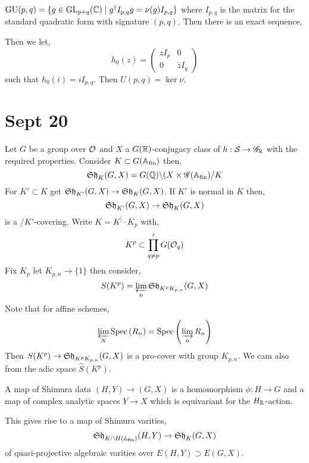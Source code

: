 \documentclass[12pt]{article}
\newcommand{\bs}{\backslash}
\begin{document}
\newcommand{\GU}{\mathrm{GU}}
\newcommand{\fin}{\mathrm{fin}}
\newcommand{\st}{\mathrm{st}}

\begin{defn}
$\GU(p,q) = \{ g \in \GL_{p+q}(\CC) \mid g^\dagger I_{p,q} g = \nu(g) I_{p,q} \}$ where $I_{p,q}$ is the matrix for the standard quadratic form with signature $(p,q)$. Then there is an exact sequence,
\begin{center}
\end{center} 
Then we let,
\[ h_0(z) = 
\begin{pmatrix}
z I_p & 0
\\
0 & \bar{z} I_q
\end{pmatrix} \]
such that $h_0(i) = i I_{p,q}$. Then $U(p,q) = \ker{\nu}$. 
\end{defn}

\section{Sept 20}


Let $G$ be a group over $\mathcal{O}_{}$ and $X$ a $G(\mathbb{R})$-conjugacy class of $h : \mathcal{S} \to \mathscr{G}_{\mathbb{R}}$ with the required properties. Consider $K \subset G(\A_{\fin})$ then,
\[ \Sh_K(G,X) = G(\Q) \bs (X \times \G(\A_{\fin}) / K \]
For $K' \subset K$ get $\mathfrak{Sh}_{K'}(G, X) \to \mathfrak{Sh}_K(G, X)$. If $K'$ is normal in $K$ then,
\[ \mathfrak{Sh}_{K'}(G, X) \to \mathfrak{Sh}_{K}(G, X) \]
is a $/K'$-covering. Write $K = K^[ \cdot K_p$ with,
\[ K^p \subset \prod_{q \neq p}' G(\mathcal{O}_{q}) \]
Fix $K_p$ let $K_{p,n} \to \{ 1 \}$ then consider,
\[ S(K^p) = \varprojlim_n \mathfrak{Sh}_{K^{p} K_{p,n}}(G, X) \]
Note that for affine schemes,
\[ \varprojlim_N \mathrm{Spec}\left( R_n \right) = \mathrm{Spec}\left( \varinjlim_n R_n \right) \]
Then $S(K^p) \to \mathfrak{Sh}_{K^p K_{p,n}}(G, X)$ is a pro-\etale cover with group $K_{p, n}$. We cam also from the adic space $\hat{S}(K^p)$.

\begin{defn}
A map of Shimura data $(H, Y) \to (G, X)$ is a homomorphism $\phi : H \to G$ and a map of complex analytic spaces $Y \to X$ which is equivariant for the $H_{\mathbb{R}}$-action.
\end{defn}

\begin{rmk}
This gives rise to a map of Shimura varities,
\[ \Sh_{K \cap H(\A_{\fin})}(H, Y) \to \Sh_K(G, X) \]
of quasi-projective algebraic varities over $E(H, Y) \supset E(G, X)$.
\end{rmk}
\end{document}
